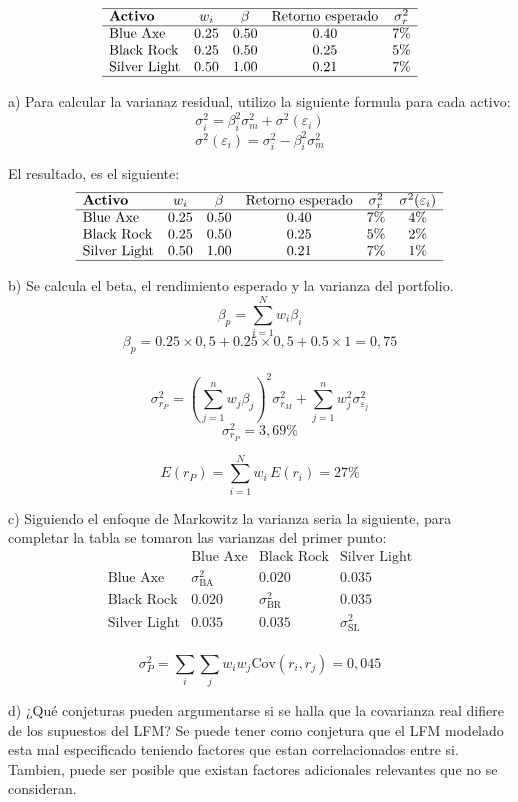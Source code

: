 \documentclass{article}
\begin{document}
\[
\begin{array}{lcccc}
\hline
\textbf{Activo} & w_i & \beta & \text{Retorno esperado} &  \sigma^2_r \\
\hline
\text{Blue Axe} & 0.25 & 0.50 & 0.40 & 7\% \\
\text{Black Rock} & 0.25 & 0.50 & 0.25 & 5\% \\
\text{Silver Light} & 0.50 & 1.00 & 0.21 & 7\% \\
\hline
\end{array}
\]

a) Para calcular la varianaz residual, utilizo la siguiente formula para cada activo:
\[
\sigma_i^2 = \beta_i^2 \sigma_m^2 + \sigma^2(\varepsilon_i)
\]
\[
\sigma^2(\varepsilon_i) = \sigma_i^2 - \beta_i^2 \sigma_m^2  
\]

El resultado, es el siguiente:
\[
\begin{array}{lccccc}
\hline
\textbf{Activo} & w_i & \beta & \text{Retorno esperado} &  \sigma^2_r & \sigma^2(\varepsilon_i) \\
\hline
\text{Blue Axe} & 0.25 & 0.50 & 0.40 & 7\%  & 4\% \\
\text{Black Rock} & 0.25 & 0.50 & 0.25 & 5\% & 2\% \\
\text{Silver Light} & 0.50 & 1.00 & 0.21 & 7\%  &  1\% \\
\hline
\end{array}
\]

b) Se calcula el beta, el rendimiento esperado y la varianza del portfolio.
\[
\beta_p = \sum_{i=1}^{N} w_i \beta_i
\]
\[
\beta_p = 0.25 \times 0,5 + 0.25 \times 0,5 + 0.5 \times 1 = 0,75
\]
\\

\[
\sigma_{r_P}^2 = (\sum_{j=1}^{n} w_j \beta_j)^2 \sigma_{r_M}^2 + \sum_{j=1}^{n} w_j^2 \sigma_{\varepsilon_j}^2
\]
\[
\sigma_{r_P}^2 = 3,69\%
\]

\[
E(r_P) = \sum_{i=1}^{N} w_i \, E(r_i) = 27\%
\]

c) Siguiendo el enfoque de Markowitz la varianza seria la siguiente, para completar la 
tabla se tomaron las varianzas del primer punto:
\[
\begin{array}{lccc}
 & \text{Blue Axe} & \text{Black Rock} & \text{Silver Light} \\
\hline
\text{Blue Axe} & \sigma_{\text{BA}}^2 & 0.020 & 0.035 \\
\text{Black Rock} & 0.020 & \sigma_{\text{BR}}^2 & 0.035 \\
\text{Silver Light} & 0.035 & 0.035 & \sigma_{\text{SL}}^2 \\
\end{array}
\]

\[
\sigma_P^2 = \sum_i \sum_j w_i w_j \mathrm{Cov}(r_i, r_j) = 0,045
\]

d)
¿Qué conjeturas pueden argumentarse si se halla que la covarianza real difiere
de los supuestos del LFM?
Se puede tener como conjetura que el LFM modelado esta mal especificado teniendo factores 
que estan correlacionados entre si. Tambien, puede ser posible que existan factores adicionales relevantes que no se consideran.
\end{document}
